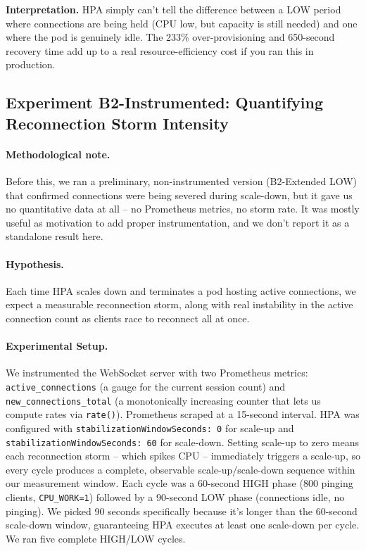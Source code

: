 \documentclass[twocolumn]{svjour3}
\begin{document}
\noindent\textbf{Interpretation.} HPA simply can't tell the difference between a
LOW period where connections are being held (CPU low, but capacity is still
needed) and one where the pod is genuinely idle. The 233\% over-provisioning and
650-second recovery time add up to a real resource-efficiency cost if you ran this
in production.

\subsection{Experiment B2-Instrumented: Quantifying Reconnection Storm Intensity}

\paragraph{Methodological note.}
Before this, we ran a preliminary, non-instrumented version (B2-Extended LOW) that
confirmed connections were being severed during scale-down, but it gave us no
quantitative data at all -- no Prometheus metrics, no storm rate. It was mostly
useful as motivation to add proper instrumentation, and we don't report it as a
standalone result here.

\paragraph{Hypothesis.} Each time HPA scales down and terminates a pod hosting
active connections, we expect a measurable reconnection storm, along with real
instability in the active connection count as clients race to reconnect all at once.

\paragraph{Experimental Setup.} We instrumented the WebSocket server with two
Prometheus metrics: \texttt{active\_connections} (a gauge for the current session
count) and \texttt{new\_connections\_total} (a monotonically increasing counter
that lets us compute rates via \texttt{rate()}). Prometheus scraped at a
15-second interval. HPA was configured with \texttt{stabilizationWindowSeconds: 0}
for scale-up and \texttt{stabilizationWindowSeconds: 60} for scale-down. Setting
scale-up to zero means each reconnection storm -- which spikes CPU -- immediately
triggers a scale-up, so every cycle produces a complete, observable
scale-up/scale-down sequence within our measurement window. Each cycle was a
60-second HIGH phase (800 pinging clients, \texttt{CPU\_WORK=1}) followed by a
90-second LOW phase (connections idle, no pinging). We picked 90 seconds
specifically because it's longer than the 60-second scale-down window, guaranteeing
HPA executes at least one scale-down per cycle. We ran five complete HIGH/LOW
cycles.
\end{document}
